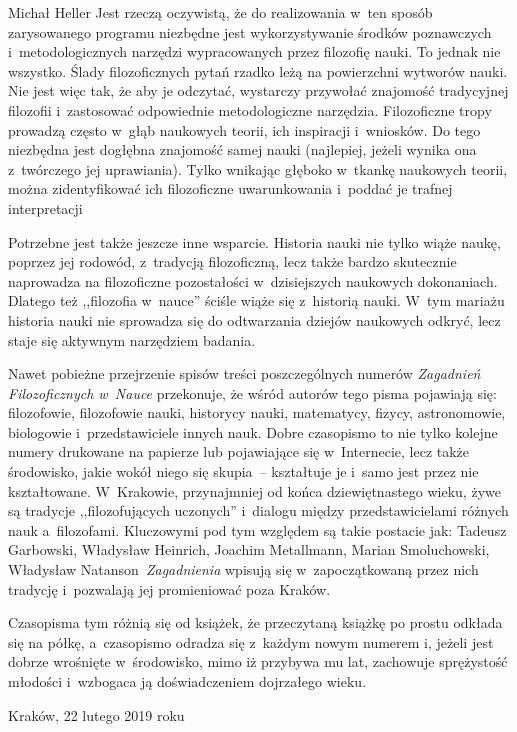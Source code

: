 \begin{editorial}{Michał Heller}
Jest rzeczą oczywistą, że do realizowania w~ten sposób zarysowanego programu niezbędne jest wykorzystywanie środków
poznawczych i~metodologicznych narzędzi wypracowanych przez filozofię nauki. To jednak nie wszystko. Ślady
filozoficznych pytań rzadko leżą na powierzchni wytworów nauki. Nie jest więc tak, że aby je odczytać, wystarczy
przywołać znajomość tradycyjnej filozofii i~zastosować odpowiednie metodologiczne narzędzia. Filozoficzne tropy
prowadzą często w~głąb naukowych teorii, ich inspiracji i~wniosków. Do tego niezbędna jest dogłębna znajomość samej
nauki (najlepiej, jeżeli wynika ona z~twórczego jej uprawiania). Tylko wnikając głęboko w~tkankę naukowych teorii,
można zidentyfikować ich filozoficzne uwarunkowania i~poddać je trafnej interpretacji

Potrzebne jest także jeszcze inne wsparcie. Historia nauki nie tylko wiąże naukę, poprzez jej rodowód, z~tradycją
filozoficzną, lecz także bardzo skutecznie naprowadza na filozoficzne pozostałości w~dzisiejszych naukowych
dokonaniach. Dlatego też ,,filozofia w~nauce'' ściśle wiąże się z~historią nauki. W~tym mariażu historia nauki nie
sprowadza się do odtwarzania dziejów naukowych odkryć, lecz staje się aktywnym narzędziem badania.

Nawet pobieżne przejrzenie spisów treści poszczególnych numerów \textit{Zagadnień Filozoficznych w~Nauce}
przekonuje, że wśród autorów tego pisma pojawiają się: filozofowie, filozofowie nauki, historycy nauki, matematycy,
fizycy, astronomowie, biologowie i~przedstawiciele innych nauk. Dobre czasopismo to nie tylko kolejne numery drukowane
na papierze lub pojawiające się w~Internecie, lecz także środowisko, jakie wokół niego się skupia~-- kształtuje je i~samo
jest przez nie kształtowane. W~Krakowie, przynajmniej od końca dziewiętnastego wieku, żywe są tradycje
,,filozofujących uczonych'' i~dialogu między przedstawicielami różnych nauk a~filozofami. Kluczowymi pod tym względem są
takie postacie jak: Tadeusz Garbowski, Władysław Heinrich, Joachim Metallmann, Marian Smoluchowski, Władysław
Natanson\mydots\ \textit{Zagadnienia} wpisują się w~zapoczątkowaną przez nich tradycję i~pozwalają jej promieniować poza
Kraków.

Czasopisma tym różnią się od książek, że przeczytaną książkę po prostu odkłada się na półkę, a~czasopismo odradza
się z~każdym nowym numerem i, jeżeli jest dobrze wrośnięte w~środowisko, mimo iż przybywa mu lat, zachowuje sprężystość
młodości i~wzbogaca ją doświadczeniem dojrzałego wieku.

{\raggedleft Kraków, 22 lutego 2019 roku\par}%




\end{editorial}